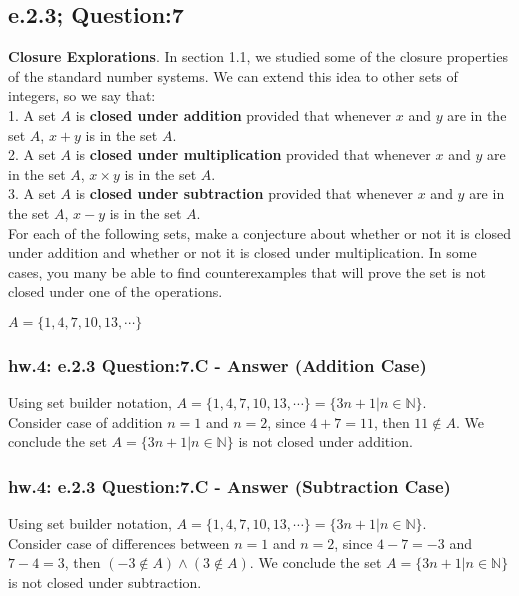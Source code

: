 \subsection{e.2.3; Question:7}
{\bf Closure Explorations}. In section 1.1, we studied some of the closure properties of the standard number systems. We can extend this idea to other sets of integers, so we say that: \\
1. A set $A$ is {\bf closed under addition} provided that whenever $x$ and $y$ are in the set $A$, $x+y$ is in the set $A$. \\
2. A set $A$ is {\bf closed under multiplication} provided that whenever $x$ and $y$ are in the set $A$, $x\times y$ is in the set $A$. \\
3. A set $A$ is {\bf closed under subtraction} provided that whenever $x$ and $y$ are in the set $A$, $x-y$ is in the set $A$. \\

For each of the following sets, make a conjecture about whether or not it is closed under addition and whether or not it is closed under multiplication. In some cases, you many be able to find counterexamples that will prove the set is not closed under one of the operations. \\

\begin{center}
$A = \{1, 4, 7, 10, 13, \cdots \}$
\end{center}

\subsubsection*{hw.4: e.2.3 Question:7.C - Answer (Addition Case)}
Using set builder notation, $A = \{1, 4, 7, 10, 13, \cdots \} = \{ 3n + 1 | n \in \mathbb{N} \}$. \\
Consider case of addition $n=1$ and $n=2$, since $4+7 = 11$, then $11 \notin A$. We conclude the set $A = \{ 3n + 1 | n \in \mathbb{N} \}$ is not closed under addition. \\

 
 
\subsubsection*{hw.4: e.2.3 Question:7.C - Answer (Subtraction Case)}
Using set builder notation, $A = \{1, 4, 7, 10, 13, \cdots \} = \{ 3n + 1 | n \in \mathbb{N} \}$. \\
Consider case of differences between $n=1$ and $n=2$, since $4-7 = -3$ and $7-4 = 3$, then $(-3 \notin A) \wedge (3 \notin A)$. We conclude the set $A = \{ 3n + 1 | n \in \mathbb{N} \}$ is not closed under subtraction. \\

